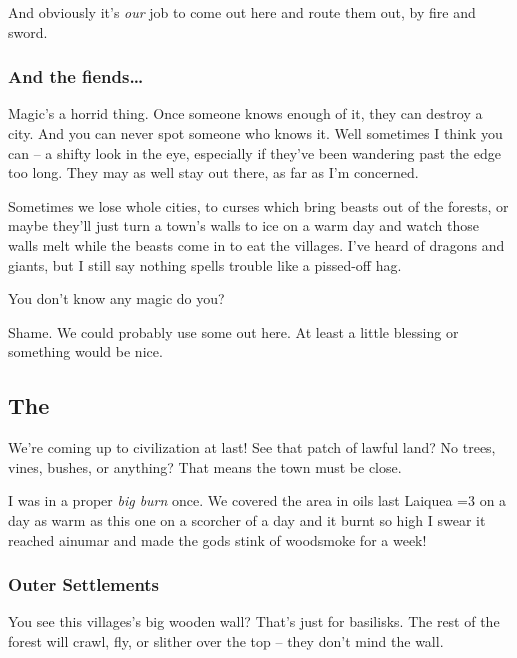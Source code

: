 \begin{multicols}{2}
\begin{exampletext}
  And obviously it's \emph{our} job to come out here and route them out, by fire and sword.


  \subsubsection*{And the fiends\ldots}

  Magic's a horrid thing.
  Once someone knows enough of it, they can destroy a city.
  And you can never spot someone who knows it.
  Well sometimes I think you can -- a shifty look in the eye, especially if they've been wandering past the \gls{edge} too long.
  They may as well stay out there, as far as I'm concerned.

  Sometimes we lose whole cities, to curses which bring beasts out of the forests, or maybe they'll just turn a town's walls to ice on a warm day and watch those walls melt while the beasts come in to eat the \glspl{village}.
  I've heard of dragons and giants, but I still say nothing spells trouble like a pissed-off hag.

  You don't know any magic do you?

  Shame.
  We could probably use some out here.
  At least a little blessing or something would be nice.
\end{exampletext}

\subsection*{The }

\begin{exampletext}
  We're coming up to civilization at last!
  See that patch of lawful land?
  No trees, vines, bushes, or anything?
  That means the town must be close.

  I was in a proper \textit{big burn} once.
  We covered the area in oils last \gls{Laiquea} \ifnum\value{temperature}=3 on a day as warm as this one \else on a scorcher of a day \fi and it burnt so high I swear it reached \gls{ainumar} and made the gods stink of woodsmoke for a week!

  \subsubsection*{Outer Settlements}

  You see this \glspl{village}'s big wooden wall?
  That's just for basilisks.
  The rest of the forest will crawl, fly, or slither over the top -- they don't mind the wall.


\end{exampletext}
\end{multicols}
